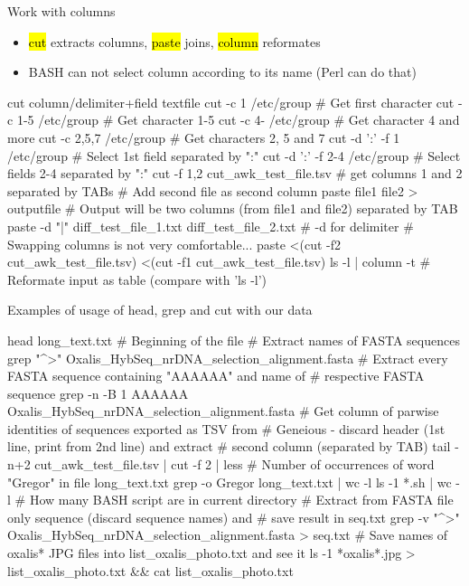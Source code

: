\documentclass[compress, ucs, xelatex, 11pt, xcolor=svgnames,
  hyperref={
    bookmarks=true,
    unicode=true,
    colorlinks=true,
    pdftitle={Linux, command line and MetaCentrum},
    plainpages=false,
    pdfauthor={Vojtech Zeisek},
    pdfsubject={Course about use of Linux command line, writing shell scripts and using MetaCentrum of CESNET},
    pdfcreator={XeLaTeX},
    pdfkeywords={Linux, GNU, BASH, shell, command line, MetaCentrum},
    linkcolor=DarkRed,
    anchorcolor=DarkBlue,
    citecolor=Indigo,
    filecolor=NavyBlue,
    menucolor=DarkMagenta,
    urlcolor=DarkBlue,
    pdftex},
  url={hyphens, lowtilde} %
  ]{beamer}
\renewcommand{\texttt}[1]{\hl{\ttfamily #1}}
\begin{document}
\begin{frame}[fragile]{Work with columns}
  \label{cutpaste}
  \begin{itemize}
    \item \texttt{cut} extracts columns, \texttt{paste} joins, \texttt{column} reformates
    \item BASH can not select column according to its name (Perl can do that)
  \end{itemize}
  \begin{bashcode}
    cut column/delimiter+field textfile
    cut -c 1 /etc/group # Get first character
    cut -c 1-5 /etc/group # Get character 1-5
    cut -c 4- /etc/group # Get character 4 and more
    cut -c 2,5,7 /etc/group # Get characters 2, 5 and 7
    cut -d ':' -f 1 /etc/group # Select 1st field separated by ":"
    cut -d ':' -f 2-4 /etc/group # Select fields 2-4 separated by ":"
    cut -f 1,2 cut_awk_test_file.tsv # get columns 1 and 2 separated by TABs
    # Add second file as second column
    paste file1 file2 > outputfile
    # Output will be two columns (from file1 and file2) separated by TAB
    paste -d "|" diff_test_file_1.txt diff_test_file_2.txt # -d for delimiter
    # Swapping columns is not very comfortable...
    paste <(cut -f2 cut_awk_test_file.tsv) <(cut -f1 cut_awk_test_file.tsv)
    ls -l | column -t # Reformate input as table (compare with 'ls -l')
  \end{bashcode}
  \vfill
\end{frame}

\begin{frame}[fragile]{Examples of usage of head, grep and cut with our data}
  \begin{bashcode}
    head long_text.txt # Beginning of the file
    # Extract names of FASTA sequences
    grep "^>" Oxalis_HybSeq_nrDNA_selection_alignment.fasta
    # Extract every FASTA sequence containing "AAAAAA" and name of
    # respective FASTA sequence
    grep -n -B 1 AAAAAA Oxalis_HybSeq_nrDNA_selection_alignment.fasta
    # Get column of parwise identities of sequences exported as TSV from
    # Geneious - discard header (1st line, print from 2nd line) and extract
    # second column (separated by TAB)
    tail -n+2 cut_awk_test_file.tsv | cut -f 2 | less
    # Number of occurrences of word "Gregor" in file long_text.txt
    grep -o Gregor long_text.txt | wc -l
    ls -1 *.sh | wc -l # How many BASH script are in current directory
    # Extract from FASTA file only sequence (discard sequence names) and
    # save result in seq.txt
    grep -v "^>" Oxalis_HybSeq_nrDNA_selection_alignment.fasta > seq.txt
    # Save names of oxalis* JPG files into list_oxalis_photo.txt and see it
    ls -1 *oxalis*.jpg > list_oxalis_photo.txt && cat list_oxalis_photo.txt
  \end{bashcode}
\end{frame}
\end{document}
